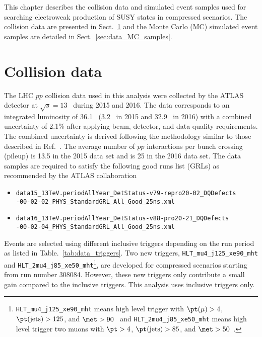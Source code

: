 This chapter describes the collision data and simulated event samples used for searching electroweak production of SUSY states in compressed scenarios.
The collision data are presented in Sect.~\ref{sec:data_collision_data} and the Monte Carlo (MC) simulated event samples are detailed in Sect.~\ref{sec:data_MC_samples}.


\section{Collision data}
\label{sec:data_collision_data}
The LHC $pp$ collision data used in this analysis were collected by the ATLAS detector at $\sqrt{s} = 13$~{\TeV} during 2015 and 2016.
The data corresponds to an integrated luminosity of 36.1~{\ifb} (3.2~{\ifb} in 2015 and 32.9~{\ifb} in 2016) with a combined uncertainty of 2.1\% after applying beam, detector, and data-quality requirements.
The combined uncertainty is derived following the methodology similar to those described in Ref.~\cite{Aaboud:2016hhf}.
The average number of $pp$ interactions per bunch crossing (pileup) is 13.5 in the 2015 data set and is 25 in the 2016 data set.
The data samples are required to satisfy the following good runs list (GRLs) as recommended by the ATLAS collaboration
%
\begin{itemize}
    \item \texttt{data15\_13TeV.periodAllYear\_DetStatus-v79-repro20-02\_DQDefects\\-00-02-02\_PHYS\_StandardGRL\_All\_Good\_25ns.xml}
    \item \texttt{data16\_13TeV.periodAllYear\_DetStatus-v88-pro20-21\_DQDefects\\-00-02-04\_PHYS\_StandardGRL\_All\_Good\_25ns.xml}
\end{itemize}
%
Events are selected using different inclusive \met triggers depending on the run period as listed in Table.~\ref{tab:data_triggers}.
Two new triggers, \texttt{HLT\_mu4\_j125\_xe90\_mht} and \texttt{HLT\_2mu4\_j85\_xe50\_mht}\footnote{\texttt{HLT\_mu4\_j125\_xe90\_mht} means high level trigger with $\pt(\mu) > 4$, $\pt(\mathrm{jets}) > 125$, and $\met > 90$~{\GeV} and \texttt{HLT\_2mu4\_j85\_xe50\_mht} means high level trigger two muons with $\pt > 4$, $\pt(\mathrm{jets}) > 85$, and $\met > 50$~{\GeV}.}, are developed for compressed scenarios starting from run number 308084.
However, these new triggers only contribute a small gain compared to the inclusive \met triggers.
This analysis uses inclusive \met triggers only.

